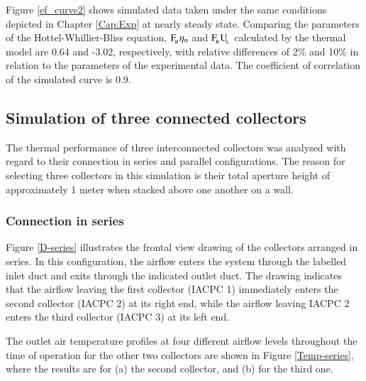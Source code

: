 
Figure \ref{ef_curve2} shows simulated data taken under the same conditions depicted in Chapter \ref{Cap:Exp} at nearly steady state. Comparing the parameters of the Hottel-Whillier-Bliss equation, $\rm{F_{\!_R}}\eta_{\rm{o}}$ and $\rm{ F_{\!_R}{U_{\!_L}}}$ calculated by the thermal model are 0.64 and -3.02, respectively, with relative differences of 2\% and 10\% in relation to the parameters of the experimental data. The coefficient of correlation  of the simulated curve is 0.9.


\subsection{Simulation of three connected collectors}

The thermal performance of three interconnected collectors was analysed with regard to their connection in series and parallel configurations. The reason for selecting three collectors in this simulation is their total aperture height of approximately 1 meter when stacked above one another on a wall.

\subsubsection{Connection in series}

Figure \ref{D-series} illustrates the frontal view drawing of the collectors arranged in series. In this configuration, the airflow enters the system through the labelled inlet duct and exits through the indicated outlet duct. The drawing indicates that the airflow leaving the first collector (IACPC 1) immediately enters the second collector (IACPC 2) at its right end, while the airflow leaving IACPC 2 enters the third collector (IACPC 3) at its left end.


The outlet air temperature profiles at four different airflow levels throughout the time of operation for the other two collectors are shown in Figure \ref{Temp-series}, where the results are for (a) the second collector, and (b) for the third one.

